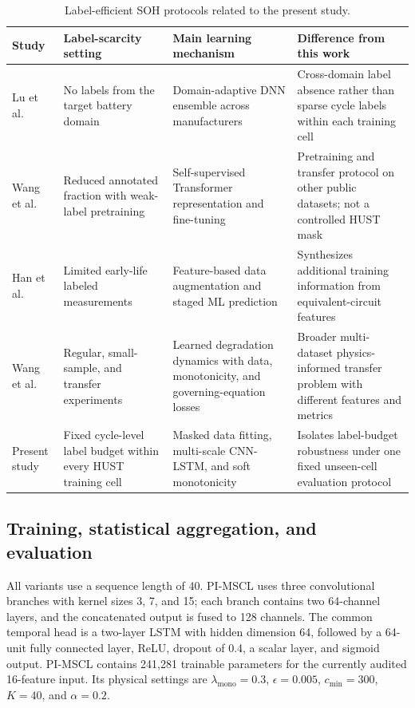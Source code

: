 \documentclass[pdflatex,sn-mathphys-num]{sn-jnl}
\begin{document}
\begin{table}[t]
\caption{Label-efficient SOH protocols related to the present study.}
\label{tab:literature_protocols}
\centering
\setlength{\tabcolsep}{3.5pt}
\renewcommand{\arraystretch}{1.10}
\begin{tabular}{@{}>{\raggedright\arraybackslash}p{}>{\raggedright\arraybackslash}p{}>{\raggedright\arraybackslash}p{}>{\raggedright\arraybackslash}p{}@{}}
\toprule
Study & Label-scarcity setting & Main learning mechanism & Difference from this work \\
\midrule
Lu et al. \cite{lu2023deep} & No labels from the target battery domain & Domain-adaptive DNN ensemble across manufacturers & Cross-domain label absence rather than sparse cycle labels within each training cell \\
Wang et al. \cite{wang2024weaklabels} & Reduced annotated fraction with weak-label pretraining & Self-supervised Transformer representation and fine-tuning & Pretraining and transfer protocol on other public datasets; not a controlled HUST mask \\
Han et al. \cite{han2024limited} & Limited early-life labeled measurements & Feature-based data augmentation and staged ML prediction & Synthesizes additional training information from equivalent-circuit features \\
Wang et al. \cite{wang2024physics} & Regular, small-sample, and transfer experiments & Learned degradation dynamics with data, monotonicity, and governing-equation losses & Broader multi-dataset physics-informed transfer problem with different features and metrics \\
Present study & Fixed cycle-level label budget within every HUST training cell & Masked data fitting, multi-scale CNN-LSTM, and soft monotonicity & Isolates label-budget robustness under one fixed unseen-cell evaluation protocol \\
\bottomrule
\end{tabular}
\end{table}

\subsection{Training, statistical aggregation, and evaluation}
\label{subsec:training_config}
\label{subsec:metrics}

All variants use a sequence length of 40. PI-MSCL uses three convolutional branches with kernel sizes 3, 7, and 15; each branch contains two 64-channel layers, and the concatenated output is fused to 128 channels. The common temporal head is a two-layer LSTM with hidden dimension 64, followed by a 64-unit fully connected layer, ReLU, dropout of 0.4, a scalar layer, and sigmoid output. PI-MSCL contains 241,281 trainable parameters for the currently audited 16-feature input. Its physical settings are $\lambda_{\mathrm{mono}}=0.3$, $\epsilon=0.005$, $c_{\min}=300$, $K=40$, and $\alpha=0.2$.
\end{document}
